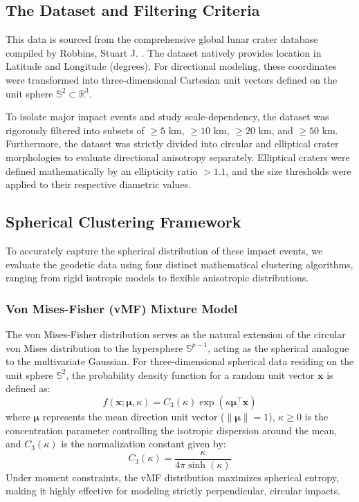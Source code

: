 \documentclass[12pt,a4paper]{report}
\begin{document}
\subsection{The Dataset and Filtering Criteria}
This data is sourced from the comprehensive global lunar crater database compiled by Robbins, Stuart J. \cite{robbins2019}. The dataset natively provides location in Latitude and Longitude (degrees). For directional modeling, these coordinates were transformed into three-dimensional Cartesian unit vectors defined on the unit sphere $\mathbb{S}^2 \subset \mathbb{R}^3$. 

To isolate major impact events and study scale-dependency, the dataset was rigorously filtered into subsets of $\ge 5$ km, $\ge 10$ km, $\ge 20$ km, and $\ge 50$ km. Furthermore, the dataset was strictly divided into circular and elliptical crater morphologies to evaluate directional anisotropy separately. Elliptical craters were defined mathematically by an ellipticity ratio $> 1.1$, and the size thresholds were applied to their respective diametric values.

\subsection{Spherical Clustering Framework}
To accurately capture the spherical distribution of these impact events, we evaluate the geodetic data using four distinct mathematical clustering algorithms, ranging from rigid isotropic models to flexible anisotropic distributions.

\subsubsection{Von Mises-Fisher (vMF) Mixture Model}
The von Mises-Fisher distribution serves as the natural extension of the circular von Mises distribution to the hypersphere $\mathbb{S}^{p-1}$, acting as the spherical analogue to the multivariate Gaussian. For three-dimensional spherical data residing on the unit sphere $\mathbb{S}^2$, the probability density function for a random unit vector $\mathbf{x}$ is defined as:
\begin{equation}
    f(\mathbf{x}; \boldsymbol{\mu}, \kappa) = C_3(\kappa) \exp(\kappa \boldsymbol{\mu}^\top \mathbf{x})
\end{equation}
where $\boldsymbol{\mu}$ represents the mean direction unit vector ($\|\boldsymbol{\mu}\| = 1$), $\kappa \ge 0$ is the concentration parameter controlling the isotropic dispersion around the mean, and $C_3(\kappa)$ is the normalization constant given by:
\begin{equation}
    C_3(\kappa) = \frac{\kappa}{4\pi \sinh(\kappa)}
\end{equation}
Under moment constraints, the vMF distribution maximizes spherical entropy, making it highly effective for modeling strictly perpendicular, circular impacts.
\end{document}
